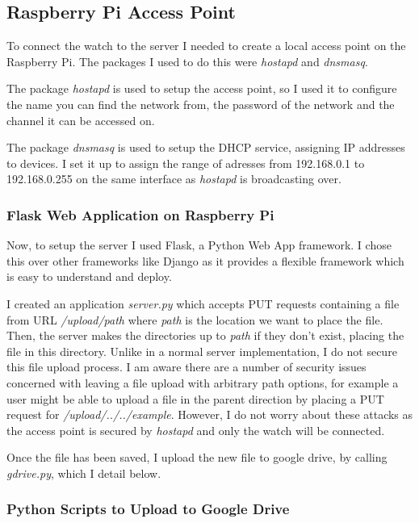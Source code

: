 \documentclass[12pt,a4paper,twoside,openright]{report}
\begin{document}
\subsection{Raspberry Pi Access Point}

To connect the watch to the server I needed to create a local access point on the
Raspberry Pi. The
packages I used to do this were \emph{hostapd} and \emph{dnsmasq}. 

The package \emph{hostapd} is used to setup the access point, so I used it to configure
the name you can find the network from, the password of the network and the
channel it can be accessed on. 

The package \emph{dnsmasq} is used to setup the DHCP service, assigning IP
addresses to devices. I set it up to assign the range of adresses from 192.168.0.1 to
192.168.0.255 on the same interface as \emph{hostapd} is broadcasting over.

\subsubsection{Flask Web Application on Raspberry Pi}

Now, to setup the server I used Flask, a Python Web App framework. I chose
this over other frameworks like Django as it provides a flexible framework
which is easy to understand and deploy.

I created an application \emph{server.py} which
accepts PUT requests containing a file from URL \emph{/upload/path} where
\emph{path} is the location we want to place the file. Then, the server
makes the directories up to \emph{path} if they don't exist, placing the file
in this directory. Unlike in a normal server implementation, I do not secure
this file upload process. I am aware there are a number of security issues
concerned with leaving a file upload with arbitrary path options, for example
a user might be able to upload a file in the parent direction by placing a PUT
request for \emph{/upload/../../example}. However, I do not worry about these
attacks as the access point is secured by \emph{hostapd} and only the watch
will be connected.

Once the file has been saved, I upload the new file to google drive, by
calling \emph{gdrive.py}, which I detail below.

\subsubsection{Python Scripts to Upload to Google Drive}
\end{document}
